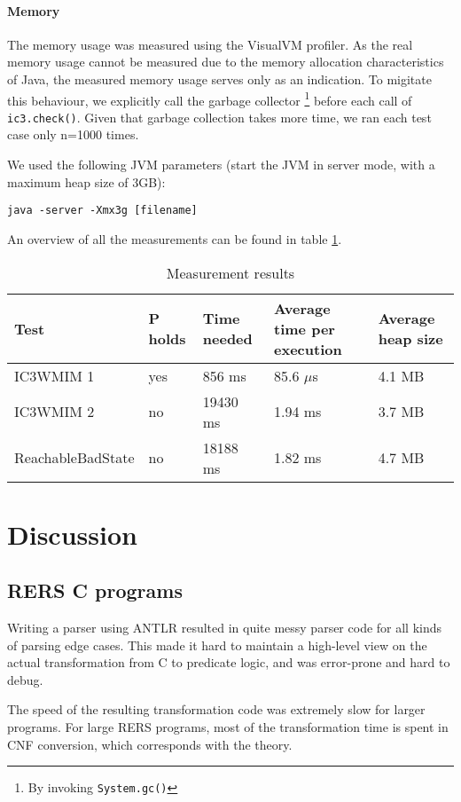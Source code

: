 \documentclass[a4paper]{article}
\begin{document}
\paragraph{Memory} The memory usage was measured using the VisualVM profiler. As the real memory usage cannot be measured due to the memory allocation characteristics of Java, the measured memory usage serves only as an indication. To migitate this behaviour, we explicitly call the garbage collector \footnote{By invoking \texttt{System.gc()}} before each call of \texttt{ic3.check()}. Given that garbage collection takes more time, we ran each test case only n=1000 times.


We used the following JVM parameters (start the JVM in server mode, with a maximum heap size of 3GB):

\texttt{java -server -Xmx3g [filename]}

An overview of all the measurements can be found in table \ref{tab:measurements}.

\begin{table}
\begin{tabularx}{\linewidth}{lllXl}
Test & P holds & Time needed & Average time per execution & Average heap size\\\hline
IC3WMIM 1 & yes & 856 ms & 85.6 $\mu$s & 4.1 MB\\
IC3WMIM 2 & no & 19430 ms & 1.94 ms & 3.7 MB\\
ReachableBadState & no & 18188 ms & 1.82 ms & 4.7 MB
\end{tabularx}
\label{tab:measurements}
\caption{Measurement results}
\end{table}

\section{Discussion}
\subsection{RERS C programs}
Writing a parser using ANTLR resulted in quite messy parser code for all kinds of parsing edge cases.
This made it hard to maintain a high-level view on the actual transformation from C to predicate logic, and was error-prone and hard to debug.

The speed of the resulting transformation code was extremely slow for larger programs. For large RERS programs, most of the transformation time is spent in CNF conversion, which corresponds with the theory.
\end{document}
